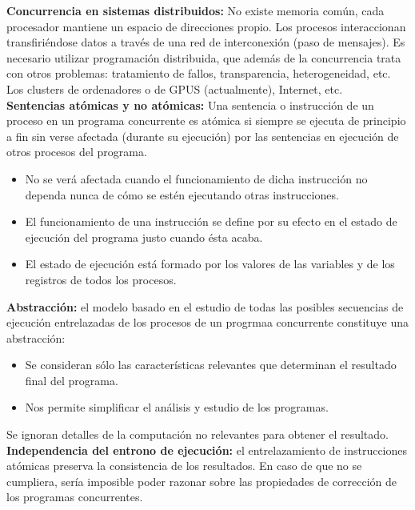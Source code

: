 \documentclass[a4paper,11pt]{article}
\begin{document}
\textbf{Concurrencia en sistemas distribuidos:} No existe memoria común, cada procesador mantiene un espacio de direcciones propio. Los procesos interaccionan transfiriéndose datos a través de una red de interconexión (paso de mensajes). Es necesario utilizar programación distribuida, que además de la concurrencia trata con otros problemas: tratamiento de fallos, transparencia, heterogeneidad, etc. Los clusters de ordenadores o de GPUS (actualmente), Internet, etc. \\

\textbf{Sentencias atómicas y no atómicas:}
Una sentencia o instrucción de un proceso en un programa concurrente es atómica si siempre se ejecuta de principio a fin sin verse afectada (durante su ejecución) por las sentencias en ejecución de otros procesos del programa. 

\begin{itemize}
\item No se verá afectada cuando el funcionamiento de dicha instrucción no dependa nunca de cómo se estén ejecutando otras instrucciones.

\item El funcionamiento de una instrucción se define por su efecto en el estado de ejecución del programa justo cuando ésta acaba.

\item El estado de ejecución está formado por los valores de las variables y de los registros de todos los procesos.
\end{itemize}

\textbf{Abstracción:} el modelo basado en el estudio de todas las posibles secuencias de ejecución entrelazadas de los procesos de un progrmaa concurrente constituye una abstracción:

\begin{itemize}
\item Se consideran sólo las características relevantes que determinan el resultado final del programa.

\item Nos permite simplificar el análisis y estudio de los programas.
\end{itemize}

Se ignoran detalles de la computación no relevantes para obtener el resultado. \\

\textbf{Independencia del entrono de ejecución:} el entrelazamiento de instrucciones atómicas preserva la consistencia de los resultados. En caso de que no se cumpliera, sería imposible poder razonar sobre las propiedades de corrección de los programas concurrentes. \\
\end{document}
